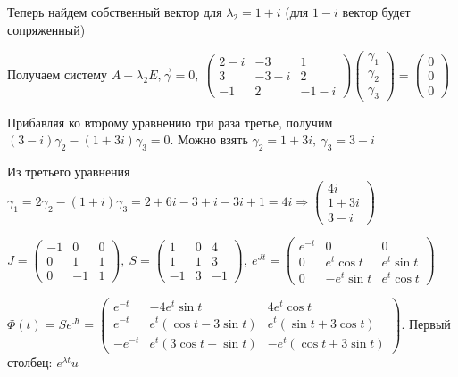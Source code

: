 \documentclass[12pt]{article}
\begin{document}
\begin{Example}{}
    Теперь найдем собственный вектор для $\lambda_2 = 1 + i$ (для $1 - i$ вектор будет сопряженный)

    Получаем систему $A - \lambda_2E, \overrightarrow{\gamma} = 0,\ \begin{pmatrix}
        2 - i & -3 & 1 \\
        3 & -3 - i & 2 \\
        -1 & 2 & -1 - i
    \end{pmatrix} \begin{pmatrix}
        \gamma_1 \\
        \gamma_2 \\
        \gamma_3
    \end{pmatrix} = \begin{pmatrix}
        0 \\
        0 \\
        0
    \end{pmatrix}$

    Прибавляя ко второму уравнению три раза третье, получим $(3 - i)\gamma_2 - (1 + 3i)\gamma_3 = 0$. Можно взять $\gamma_2 = 1 + 3i,\ \gamma_3 = 3 - i$
    
    Из третьего уравнения $\gamma_1 = 2\gamma_2 - (1 + i)\gamma_3 = 2 + 6i - 3 + i - 3i + 1 = 4i \Rightarrow \begin{pmatrix}
        4i \\
        1 + 3i \\
        3 - i
    \end{pmatrix}$
    
    $J = \begin{pmatrix}
        -1 & 0 & 0 \\
        0 & 1 & 1 \\
        0 & -1 & 1
    \end{pmatrix},\ S = \begin{pmatrix}
        1 & 0 & 4 \\
        1 & 1 & 3 \\
        -1 & 3 & -1
    \end{pmatrix},\ e^{Jt} = \begin{pmatrix}
        e^{-t} & 0 & 0 \\
        0 & e^t \cos t & e^t \sin t \\
        0 & -e^t \sin t & e^t \cos t
    \end{pmatrix}$

    $\Phi(t) = Se^{Jt} = \begin{pmatrix}
        e^{-t} & -4e^t \sin t & 4e^t \cos t \\
        e^{-t} & e^t (\cos t - 3\sin t) & e^t (\sin t + 3\cos t) \\
        -e^{-t} & e^t (3\cos t + \sin t) & -e^t(\cos t + 3\sin t)
    \end{pmatrix}$. Первый столбец: $e^{\lambda t}u$


\end{Example}
\end{document}
